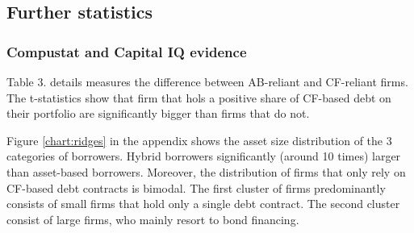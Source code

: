 \documentclass[12pt]{article}
\begin{document}
\newpage
\subsection{Further statistics \label{sec:A4}}
\subsubsection{Compustat and Capital IQ evidence}
Table 3. details measures the difference between AB-reliant and CF-reliant firms. The t-statistics show that firm that hols a positive share of CF-based debt on their portfolio are significantly bigger than firms that do not. 

\begin{table}[H]
\centering
{}
\caption{\small Summary Statistics: a comparison of average values of ABL firms and CFL firms, the P-value reports the probability of the two sample averages being same.} \label{tab:t-tests}
\end{table}
\noindent Figure \ref{chart:ridges} in the appendix shows the asset size distribution of the 3 categories of borrowers. Hybrid borrowers significantly (around 10 times) larger than asset-based borrowers. Moreover, the distribution of firms that only rely on CF-based debt contracts is bimodal. The first cluster of firms predominantly consists of small firms that hold only a single debt contract. The second cluster consist of large firms, who mainly resort to bond financing. 
\end{document}
